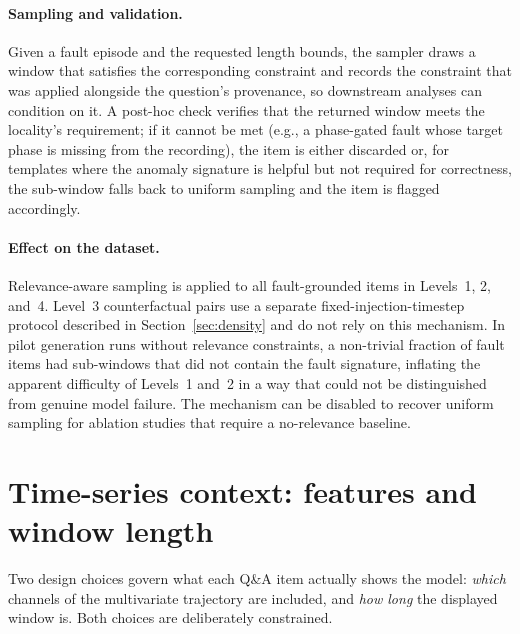 \documentclass{article}
\begin{document}
\paragraph{Sampling and validation.} Given a fault episode and the requested length bounds, the sampler draws a window that satisfies the corresponding constraint and records the constraint that was applied alongside the question's provenance, so downstream analyses can condition on it. A post-hoc check verifies that the returned window meets the locality's requirement; if it cannot be met (e.g., a phase-gated fault whose target phase is missing from the recording), the item is either discarded or, for templates where the anomaly signature is helpful but not required for correctness, the sub-window falls back to uniform sampling and the item is flagged accordingly.

\paragraph{Effect on the dataset.} Relevance-aware sampling is applied to all fault-grounded items in Levels~1, 2, and~4. Level~3 counterfactual pairs use a separate fixed-injection-timestep protocol described in Section~\ref{sec:density} and do not rely on this mechanism. In pilot generation runs without relevance constraints, a non-trivial fraction of fault items had sub-windows that did not contain the fault signature, inflating the apparent difficulty of Levels~1 and~2 in a way that could not be distinguished from genuine model failure. The mechanism can be disabled to recover uniform sampling for ablation studies that require a no-relevance baseline.

\section{Time-series context: features and window length}
\label{app:context_construction}

Two design choices govern what each Q\&A item actually shows the model: \emph{which} channels of the multivariate trajectory are included, and \emph{how long} the displayed window is. Both choices are deliberately constrained.
\end{document}
